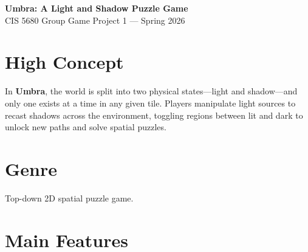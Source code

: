 \documentclass[11pt, letterpaper]{article}
\begin{document}
\begin{center}
    {\Large \textbf{Umbra: A Light and Shadow Puzzle Game}}\\[2pt]
    {\small CIS 5680 Group Game Project 1 --- Spring 2026}
\end{center}

\vspace{-4pt}

\section*{High Concept}

In \textbf{Umbra}, the world is split into two physical states---light and shadow---and only one
exists at a time in any given tile. Players manipulate light sources to recast shadows across the
environment, toggling regions between lit and dark to unlock new paths and solve spatial puzzles.

\section*{Genre}

Top-down 2D spatial puzzle game.

\section*{Main Features}
\end{document}
